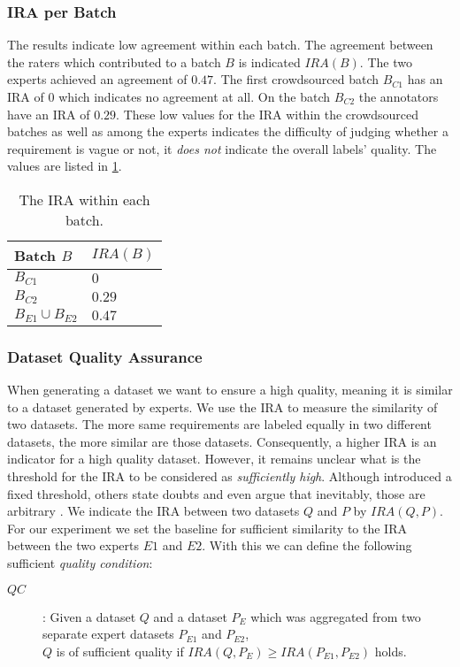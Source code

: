 \subsubsection{\Ac{IRA} per Batch}
The results indicate low agreement within each batch.
The agreement between the raters which contributed to a batch $B$ is indicated $IRA(B)$.
The two experts achieved an agreement of $0.47$.
The first crowdsourced batch $B_{C1}$ has an \ac{IRA} of $0$ which indicates no agreement at all.
On the batch $B_{C2}$ the annotators have an \ac{IRA} of $0.29$.
These low values for the \ac{IRA} within the crowdsourced batches as well as among the experts indicates the difficulty of judging whether a requirement is vague or not, it \textit{does not} indicate the overall labels' quality.
The values are listed in \cref{tab:study:objects:crowdsourcing:batches:IRA}.
\begin{table}[htpb]
    \centering
    \begin{tabular}{l l}
        \toprule
        Batch $B$ & $IRA(B)$ \\
        \midrule
        $B_{C1}$ & $0$\\
        $B_{C2}$ & $0.29$\\
        $B_{E1} \cup B_{E2}$ & $0.47$ \\
        \bottomrule
    \end{tabular}
    \caption[Inter rater agreement within the batches]{The \ac{IRA} within each batch.}\label{tab:study:objects:crowdsourcing:batches:IRA}
\end{table}

\subsubsection{Dataset Quality Assurance}
When generating a dataset we want to ensure a high quality, meaning it is similar to a dataset generated by experts.
We use the \ac{IRA} to measure the similarity of two datasets.
The more same requirements are labeled equally in two different datasets, the more similar are those datasets.
Consequently, a higher \ac{IRA} is an indicator for a high quality dataset.
However, it remains unclear what is the threshold for the \ac{IRA} to be considered as \textit{sufficiently high}.
Although \textcite{Landis:1977} introduced a fixed threshold, others state doubts and even argue that inevitably, those are arbitrary \parencites{Dunn:1989}{Brennan:1992}.
We indicate the \ac{IRA} between two datasets $Q$ and $P$ by $IRA(Q, P)$.
For our experiment we set the baseline for sufficient similarity to the \ac{IRA} between the two experts $E1$ and $E2$.
With this we can define the following sufficient \textit{quality condition}:
\begin{description}
    \item[$QC$]: Given a dataset $Q$ and a dataset $P_E$ which was aggregated from two separate expert datasets $P_{E1}$ and $P_{E2}$,\\
    $Q$ is of sufficient quality if $IRA(Q, P_E) \ge IRA(P_{E1}, P_{E2})$ holds.
\end{description}

